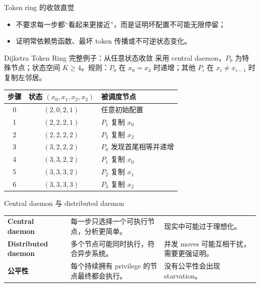 \documentclass[UTF8,fontset=none,aspectratio=169,10pt]{beamer}
\begin{document}
\begin{frame}{Token ring 的收敛直觉}
\begin{center}
\end{center}
\begin{itemize}
  \item 不要求每一步都“看起来更接近”，而是证明坏配置不可能无限停留；
  \item 证明常依赖势函数、最坏 token 传播或不可逆状态变化。
\end{itemize}
\end{frame}

\begin{frame}{Dijkstra Token Ring 完整例子：从任意状态收敛}
\small
采用 central daemon，$P_0$ 为特殊节点；状态空间 $K\geq4$。规则：$P_0$ 在 $x_0=x_3$ 时递增；其他 $P_i$ 在 $x_i\ne x_{i-1}$ 时复制左邻居。
\begin{center}
\begin{tabular}{c|c|l}
\toprule
步骤 & 状态 $(x_0,x_1,x_2,x_3)$ & 被调度节点 \\
\midrule
0 & $(2,0,2,1)$ & 任意初始配置 \\
1 & $(2,2,2,1)$ & $P_1$ 复制 $x_0$ \\
2 & $(2,2,2,2)$ & $P_3$ 复制 $x_2$ \\
3 & $(3,2,2,2)$ & $P_0$ 发现首尾相等并递增 \\
4 & $(3,3,2,2)$ & $P_1$ 复制 $x_0$ \\
5 & $(3,3,3,2)$ & $P_2$ 复制 $x_1$ \\
6 & $(3,3,3,3)$ & $P_3$ 复制 $x_2$ \\
\bottomrule
\end{tabular}
\end{center}
\end{frame}

\begin{frame}{Central daemon 与 distributed daemon}
\begin{tabularx}{\linewidth}{>{\bfseries}p{3cm}XX}
\toprule
Central daemon & 每一步只选择一个可执行节点，分析更简单。 & 现实中可能过于理想化。 \\
Distributed daemon & 多个节点可能同时执行，符合异步系统。 & 并发 moves 可能互相干扰，需要更强证明。 \\
公平性 & 每个持续拥有 privilege 的节点最终都会执行。 & 没有公平性会出现 starvation。 \\
\bottomrule
\end{tabularx}
\end{frame}
\end{document}
